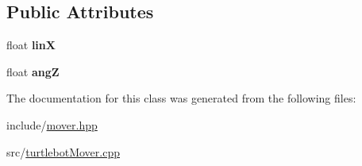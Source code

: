 \subsection*{Public Attributes}
\begin{DoxyCompactItemize}
\item 
\mbox{\label{class_turtlebot_mover_aeb87669e7e8e721525eb267a56e85c11}} 
float {\bfseries linX}
\item 
\mbox{\label{class_turtlebot_mover_aba1eb949c32fbda7627802d24a0e1ab4}} 
float {\bfseries angZ}
\end{DoxyCompactItemize}


The documentation for this class was generated from the following files\+:\begin{DoxyCompactItemize}
\item 
include/\hyperlink{mover_8hpp}{mover.\+hpp}\item 
src/\hyperlink{turtlebot_mover_8cpp}{turtlebot\+Mover.\+cpp}\end{DoxyCompactItemize}
